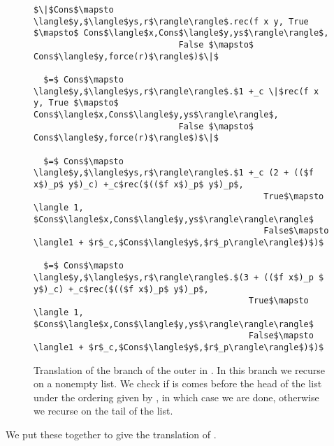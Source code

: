 \begin{figure}[H]
\caption{Translation of the  branch of the outer  in .
In this branch we recurse on a nonempty list.
We check if  is comes before the head of the list under the ordering given by , in which case we are done, 
  otherwise we recurse on the tail of the list.
}
\label{fig:insert_cons}
\begin{lstlisting}
$\|$Cons$\mapsto \langle$y,$\langle$ys,r$\rangle\rangle$.rec(f x y, True $\mapsto$ Cons$\langle$x,Cons$\langle$y,ys$\rangle\rangle$,
                             False $\mapsto$ Cons$\langle$y,force(r)$\rangle$)$\|$

  $=$ Cons$\mapsto \langle$y,$\langle$ys,r$\rangle\rangle$.$1 +_c \|$rec(f x y, True $\mapsto$ Cons$\langle$x,Cons$\langle$y,ys$\rangle\rangle$,
                             False $\mapsto$ Cons$\langle$y,force(r)$\rangle$)$\|$

  $=$ Cons$\mapsto \langle$y,$\langle$ys,r$\rangle\rangle$.$1 +_c (2 + (($f x$)_p$ y$)_c) +_c$rec($(($f x$)_p$ y$)_p$,
                                              True$\mapsto \langle 1, $Cons$\langle$x,Cons$\langle$y,ys$\rangle\rangle\rangle$
                                              False$\mapsto \langle1 + $r$_c,$Cons$\langle$y$,$r$_p\rangle\rangle$)$)$

  $=$ Cons$\mapsto \langle$y,$\langle$ys,r$\rangle\rangle$.$(3 + (($f x$)_p $ y$)_c) +_c$rec($(($f x$)_p$ y$)_p$,
                                           True$\mapsto \langle 1, $Cons$\langle$x,Cons$\langle$y,ys$\rangle\rangle\rangle$
                                           False$\mapsto \langle1 + $r$_c,$Cons$\langle$y$,$r$_p\rangle\rangle$)$)$
\end{lstlisting}
\end{figure}


We put these together to give the translation of .

